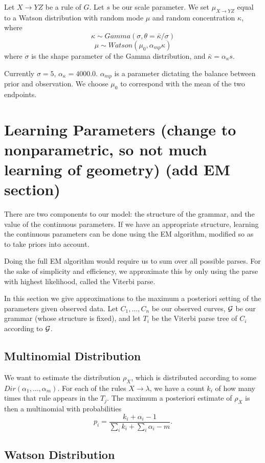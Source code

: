 Let $X\to YZ$ be a rule of $G$. Let $s$ be our scale parameter.  We
set $\mu_{X\to YZ}$ equal to a Watson distribution with random mode $\mu$ and
random concentration $\kappa$, where
$$\kappa \sim Gamma(\sigma, \theta=\bar{\kappa}/\sigma)$$
$$\mu \sim Watson(\mu_0, \alpha_{mp} \kappa)$$
where $\sigma$ is the shape parameter of the Gamma distribution, and
$\bar{\kappa} = \alpha_{\kappa} s$. 

Currently $\sigma=5$, $\alpha_\kappa = 4000.0$. $\alpha_{mp}$ is a
parameter dictating the balance between prior and observation.  We
choose $\mu_0$ to correspond with the mean of the two endpoints.


\section{Learning Parameters (change to nonparametric, so not much learning of geometry) (add EM section)}

There are two components to our model: the structure of the grammar,
and the value of the continuous parameters. If we have an appropriate
structure, learning the continuous parameters can be done using the EM
algorithm, modified so as to take priors into account.

Doing the full EM algorithm would require us to sum over all possible
parses. For the sake of simplicity and efficiency, we approximate this
by only using the parse with highest likelihood, called the Viterbi
parse.

In this section we give approximations to the maximum a posteriori
setting of the parameters given observed data. Let $C_1, \dots, C_n$
be our observed curves, ${\mathcal G}$ be our grammar (whose structure is
fixed), and let $T_i$ be the Viterbi parse tree of $C_i$ according to
${\mathcal G}$.

\subsection{Multinomial Distribution}

We want to estimate the distribution $\rho_X$, which is distributed
according to some $Dir(\alpha_1, \dots, \alpha_m)$. For each of the
rules $X\to \lambda$, we have a count $k_i$ of how many times that
rule appears in the $T_j$. The maximum a posteriori estimate of
$\rho_X$ is then a multinomial with probabilities 
$$p_i = \frac{k_i + \alpha_i - 1}{\sum_i k_i + \sum_i \alpha_i - m}.$$

\subsection{Watson Distribution}

